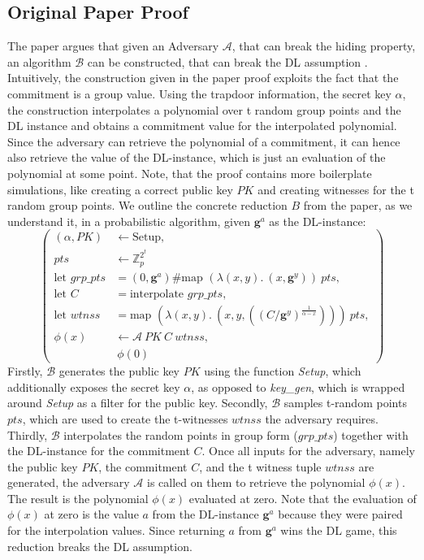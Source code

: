 \subsection{Original Paper Proof}
The paper argues that given an Adversary $\mathcal{A}$, that can break the hiding property, an algorithm $\mathcal{B}$ can be constructed, that can break the DL assumption \parencite{KZG}. Intuitively, the construction given in the paper proof exploits the fact that the commitment is a group value. Using the trapdoor information, the secret key $\alpha$, the construction interpolates a polynomial over t random group points and the DL instance and obtains a commitment value for the interpolated polynomial. Since the adversary can retrieve the polynomial of a commitment, it can hence also retrieve the value of the DL-instance, which is just an evaluation of the polynomial at some point. Note, that the proof contains more boilerplate simulations, like creating a correct public key $PK$ and creating witnesses for the t random group points. We outline the concrete reduction $B$ from the paper, as we understand it, in a probabilistic algorithm, given $\mathbf{g}^a$ as the DL-instance:
\begin{equation*}
    \left(
        \begin{aligned}
            (\alpha,PK) & \leftarrow \text{Setup}, \\
            pts & \leftarrow \mathbb{Z}_p^{2^t}\\
            \text{let } grp\_pts &= (0,\mathbf{g}^a)\#\text{map } (\lambda (x,y).\ (x,\mathbf{g}^y))\ pts,\\
            \text{let } C &= \text{interpolate } grp\_pts,\\ 
            \text{let } wtnss &= \text{map } (\lambda (x,y).\ (x,y, ((C/\mathbf{g}^y)^{\frac{1}{\alpha-x}})))\ pts,\\
            \phi(x) & \leftarrow \mathcal{A}\ PK \ C\ wtnss, \\
            & \ \phi(0)
        \end{aligned}
    \right)
\end{equation*}
Firstly, $\mathcal{B}$ generates the public key $PK$ using the function \textit{Setup}, which additionally exposes the secret key $\alpha$, as opposed to \textit{key\_gen}, which is wrapped around \textit{Setup} as a filter for the public key. Secondly, $\mathcal{B}$ samples t-random points $pts$, which are used to create the t-witnesses $wtnss$ the adversary requires. Thirdly, $\mathcal{B}$ interpolates the random points in group form ($grp\_pts$) together with the DL-instance for the commitment $C$. Once all inputs for the adversary, namely the public key $PK$, the commitment $C$, and the t witness tuple $wtnss$ are generated, the adversary $\mathcal{A}$ is called on them to retrieve the polynomial $\phi(x)$. The result is the polynomial $\phi(x)$ evaluated at zero. Note that the evaluation of $\phi(x)$ at zero is the value $a$ from the DL-instance $\mathbf{g}^a$ because they were paired for the interpolation values. Since returning $a$ from $\mathbf{g}^a$ wins the DL game, this reduction breaks the DL assumption.

